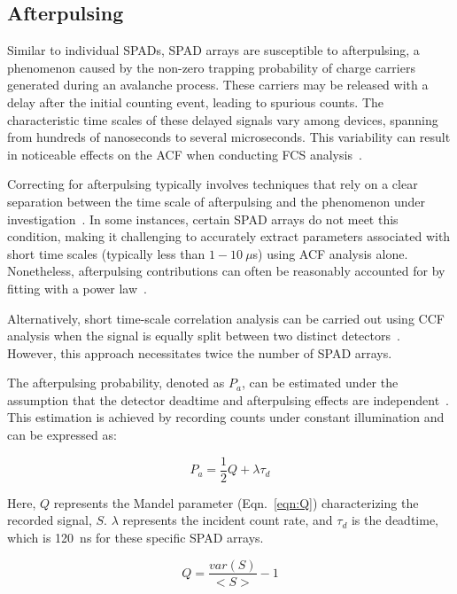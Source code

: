 \subsection{Afterpulsing}
\label{sec:Pa}

Similar to individual \ac{SPAD}s, \ac{SPAD} arrays are susceptible to afterpulsing, a phenomenon caused by the non-zero trapping probability of charge carriers generated during an avalanche process. 
These carriers may be released with a delay after the initial counting event, leading to spurious counts. 
The characteristic time scales of these delayed signals vary among devices, spanning from hundreds of nanoseconds to several microseconds. 
This variability can result in noticeable effects on the \ac{ACF} when conducting \ac{FCS} analysis~\cite{colyer_BOE_2010,ingargiola_PLOS1_2016}.

Correcting for afterpulsing typically involves techniques that rely on a clear separation between the time scale of afterpulsing and the phenomenon under investigation~\cite{zhao_AO_2003}. 
In some instances, certain \ac{SPAD} arrays do not meet this condition, making it challenging to accurately extract parameters associated with short time scales (typically less than $1-10~\mu$s) using \ac{ACF} analysis alone. 
Nonetheless, afterpulsing contributions can often be reasonably accounted for by fitting with a power law~\cite{colyer_BOE_2010,ingargiola_PLOS1_2016}.

Alternatively, short time-scale correlation analysis can be carried out using \ac{CCF} analysis when the signal is equally split between two distinct detectors~\cite{krichevsky_RPP_2002}. 
However, this approach necessitates twice the number of \ac{SPAD} arrays.

The afterpulsing probability, denoted as $P_a$, can be estimated under the assumption that the detector deadtime and afterpulsing effects are independent~\cite{Finn_RSI_1988}. 
This estimation is achieved by recording counts under constant illumination and can be expressed as:

\begin{equation}
\label{eqn:Pa}
P_a=\frac{1}{2}Q+\lambda\tau_d
\end{equation}

\noindent
Here, $Q$ represents the Mandel parameter (Eqn.~\ref{eqn:Q}) characterizing the recorded signal, $S$. 
$\lambda$ represents the incident count rate, and $\tau_d$ is the deadtime, which is 120~ns for these specific \ac{SPAD} arrays.

\begin{equation}
\label{eqn:Q}
Q=\frac{var\left(S\right)}{<S>}-1
\end{equation}

